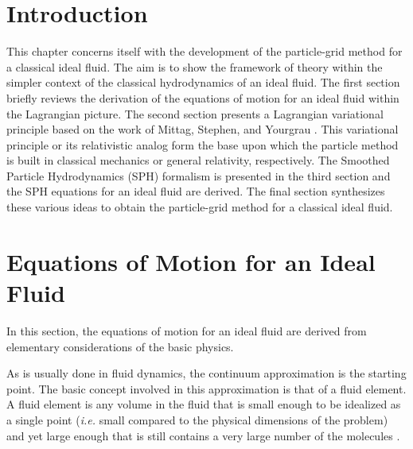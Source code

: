 
\section{Introduction}
This chapter concerns itself with the development of the particle-grid method
for a classical ideal fluid.  The aim is to show the framework of theory within the
simpler context of the classical hydrodynamics of an ideal fluid.  The first section
briefly reviews the derivation of the equations of motion for an ideal fluid within
the Lagrangian picture.  The second section presents a Lagrangian variational principle
based on the work of Mittag, Stephen, and Yourgrau .  This variational principle or
its relativistic analog form the base upon which the particle method is built in classical
mechanics or general relativity, respectively.
The Smoothed Particle Hydrodynamics (SPH) formalism is presented in
the third section and the SPH equations for an ideal fluid are derived.  The final section
synthesizes these various ideas to obtain the particle-grid method for a classical ideal fluid.


\section{Equations of Motion for an Ideal Fluid}\label{cfm}

In this section, the equations of motion for an ideal fluid are
derived from elementary considerations of the basic physics.

As is usually done in fluid dynamics, the continuum approximation is the starting point.
The basic concept involved in this approximation is that of a fluid element.  A fluid element
is any volume in the fluid that is small enough to be idealized as a
single point (\textit{i.e.} small compared to the physical dimensions of the problem)
and yet large enough that is still contains a very large number of the
molecules .

